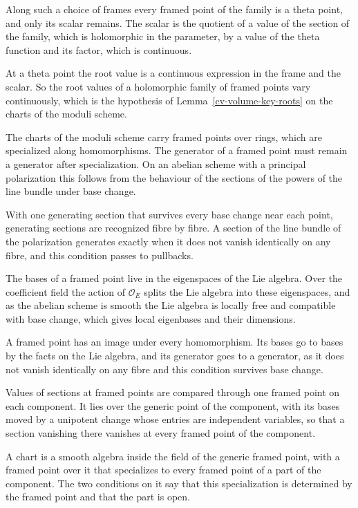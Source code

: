 Along such a choice of frames every framed point of the family is a theta point, and only its scalar remains.
The scalar is the quotient of a value of the section of the family, which is holomorphic in the parameter, by a
value of the theta function and its factor, which is continuous.

At a theta point the root value is a continuous expression in the frame and the scalar. So the root values of a
holomorphic family of framed points vary continuously, which is the hypothesis of
Lemma~\ref{cv-volume-key-roots} on the charts of the moduli scheme.

The charts of the moduli scheme carry framed points over rings, which are specialized along homomorphisms. The
generator of a framed point must remain a generator after specialization. On an abelian scheme with a principal
polarization this follows from the behaviour of the sections of the powers of the line bundle under base change.

With one generating section that survives every base change near each point, generating sections are recognized
fibre by fibre. A section of the line bundle of the polarization generates exactly when it does not vanish
identically on any fibre, and this condition passes to pullbacks.

The bases of a framed point live in the eigenspaces of the Lie algebra. Over the coefficient field the action of
$\mathcal O_E$ splits the Lie algebra into these eigenspaces, and as the abelian scheme is smooth the Lie algebra
is locally free and compatible with base change, which gives local eigenbases and their dimensions.

A framed point has an image under every homomorphism. Its bases go to bases by the facts on the Lie algebra, and
its generator goes to a generator, as it does not vanish identically on any fibre and this condition survives base
change.

Values of sections at framed points are compared through one framed point on each component. It lies over the
generic point of the component, with its bases moved by a unipotent change whose entries are independent
variables, so that a section vanishing there vanishes at every framed point of the component.

A chart is a smooth algebra inside the field of the generic framed point, with a framed point over it that
specializes to every framed point of a part of the component. The two conditions on it say that this
specialization is determined by the framed point and that the part is open.

